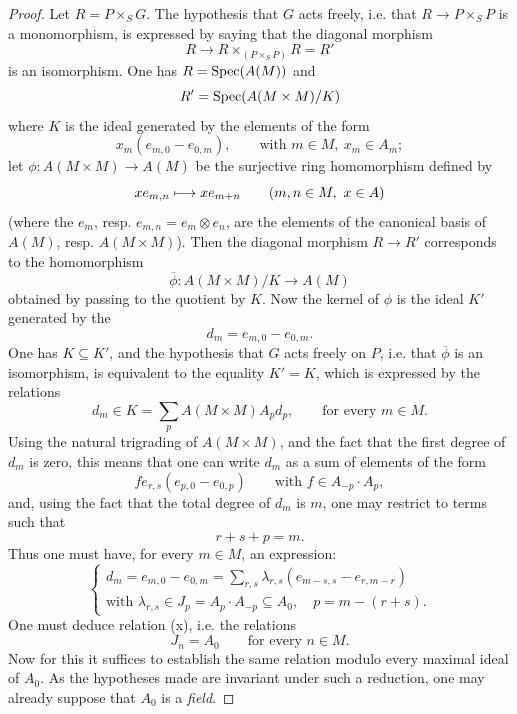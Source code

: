 \begin{proof}
Let $R=P\times_S G$. The hypothesis that $G$ acts freely, i.e. that $R\to P\times_S P$ is a monomorphism, is expressed by saying that the diagonal morphism
\[
R\to R\mathop{\times}_{(P\times_S P)}R=R'
\]
is an isomorphism. One has $R=\operatorname{Spec}(A(M))$ and
\[
R'=\operatorname{Spec}(A(M\times M)/K)
\]
where $K$ is the ideal generated by the elements of the form
\[
x_m(e_{m,0}-e_{0,m}),\qquad\text{with }m\in M,\ x_m\in A_m;
\]
let $\phi:A(M\times M)\to A(M)$ be the surjective ring homomorphism defined by
\[
x e_{m,n}\longmapsto x e_{m+n}\qquad(m,n\in M,\ x\in A)
\]
(where the $e_m$, resp. $e_{m,n}=e_m\otimes e_n$, are the elements of the canonical basis of $A(M)$, resp. $A(M\times M)$). Then the diagonal morphism $R\to R'$ corresponds to the homomorphism
\[
\overline\phi:A(M\times M)/K\to A(M)
\]
obtained by passing to the quotient by $K$. Now the kernel of $\phi$ is the ideal $K'$ generated by the
\[
d_m=e_{m,0}-e_{0,m}.
\]
One has $K\subseteq K'$, and the hypothesis that $G$ acts freely on $P$, i.e. that $\overline\phi$ is an isomorphism, is equivalent to the equality $K'=K$, which is expressed by the relations
\begin{equation}\tag{xx}
d_m\in K=\sum_p A(M\times M)A_pd_p,\qquad\text{for every }m\in M.
\end{equation}
Using the natural trigrading of $A(M\times M)$, and the fact that the first degree of $d_m$ is zero, this means that one can write $d_m$ as a sum of elements of the form
\[
f e_{r,s}(e_{p,0}-e_{0,p})\qquad\text{with }f\in A_{-p}\cdot A_p,
\]
and, using the fact that the total degree of $d_m$ is $m$, one may restrict to terms such that
\[
r+s+p=m.
\]
Thus one must have, for every $m\in M$, an expression:
\begin{equation}\tag{xxx}
\begin{cases}
d_m=e_{m,0}-e_{0,m}=\displaystyle\sum_{r,s}\lambda_{r,s}(e_{m-s,s}-e_{r,m-r})\\
\text{with }\lambda_{r,s}\in J_p=A_p\cdot A_{-p}\subseteq A_0,\quad p=m-(r+s).
\end{cases}
\end{equation}
One must deduce relation (x), i.e. the relations
\begin{equation}\tag{xxxx}
J_n=A_0\qquad\text{for every }n\in M.
\end{equation}
Now for this it suffices to establish the same relation modulo every maximal ideal of $A_0$. As the hypotheses made are invariant under such a reduction, one may already suppose that $A_0$ is a \emph{field}.


\end{proof}
